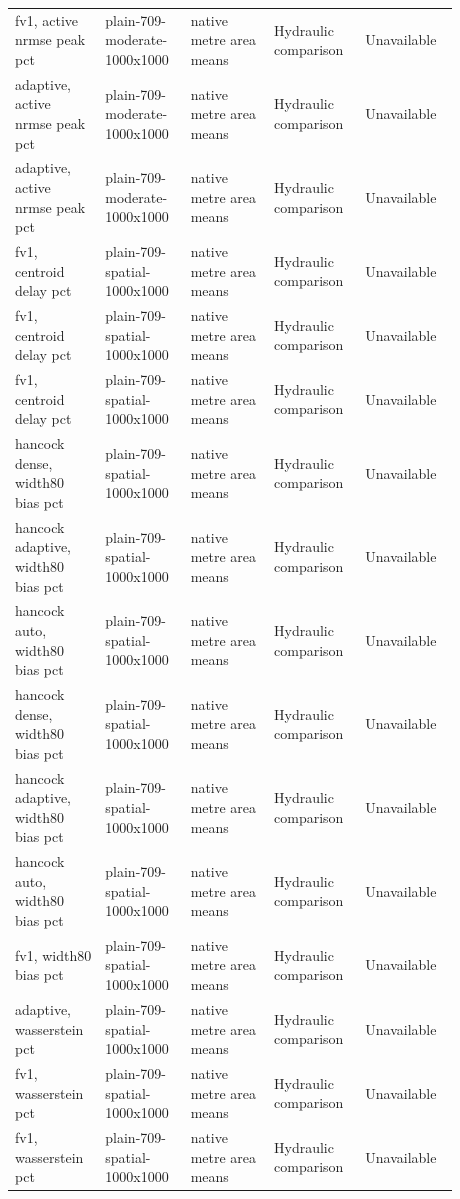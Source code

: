 \begin{longtable}{p{0.1760\linewidth}p{0.1760\linewidth}p{0.1760\linewidth}p{0.1760\linewidth}p{0.1760\linewidth}}
fv1, active nrmse peak pct & plain-709-moderate-1000x1000 & native metre area means & Hydraulic comparison & Unavailable \\
adaptive, active nrmse peak pct & plain-709-moderate-1000x1000 & native metre area means & Hydraulic comparison & Unavailable \\
adaptive, active nrmse peak pct & plain-709-moderate-1000x1000 & native metre area means & Hydraulic comparison & Unavailable \\
fv1, centroid delay pct & plain-709-spatial-1000x1000 & native metre area means & Hydraulic comparison & Unavailable \\
fv1, centroid delay pct & plain-709-spatial-1000x1000 & native metre area means & Hydraulic comparison & Unavailable \\
fv1, centroid delay pct & plain-709-spatial-1000x1000 & native metre area means & Hydraulic comparison & Unavailable \\
hancock dense, width80 bias pct & plain-709-spatial-1000x1000 & native metre area means & Hydraulic comparison & Unavailable \\
hancock adaptive, width80 bias pct & plain-709-spatial-1000x1000 & native metre area means & Hydraulic comparison & Unavailable \\
hancock auto, width80 bias pct & plain-709-spatial-1000x1000 & native metre area means & Hydraulic comparison & Unavailable \\
hancock dense, width80 bias pct & plain-709-spatial-1000x1000 & native metre area means & Hydraulic comparison & Unavailable \\
hancock adaptive, width80 bias pct & plain-709-spatial-1000x1000 & native metre area means & Hydraulic comparison & Unavailable \\
hancock auto, width80 bias pct & plain-709-spatial-1000x1000 & native metre area means & Hydraulic comparison & Unavailable \\
fv1, width80 bias pct & plain-709-spatial-1000x1000 & native metre area means & Hydraulic comparison & Unavailable \\
adaptive, wasserstein pct & plain-709-spatial-1000x1000 & native metre area means & Hydraulic comparison & Unavailable \\
fv1, wasserstein pct & plain-709-spatial-1000x1000 & native metre area means & Hydraulic comparison & Unavailable \\
fv1, wasserstein pct & plain-709-spatial-1000x1000 & native metre area means & Hydraulic comparison & Unavailable \\

\end{longtable}

